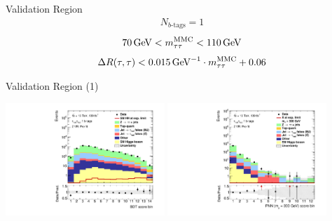 \documentclass[11pt, xcolor={dvipsnames}, aspectratio=169]{beamer}
\begin{document}

\begin{frame}{ Validation Region}
  \begin{align*}
    N_{b\text{-tags}} = 1
  \end{align*}
  \begin{align*}
    \SI{70}{\GeV} < \mMMC < \SI{110}{\GeV}
  \end{align*}
  \begin{align*}
    \dRtautau < \SI{0.015}{\per\GeV} \cdot \mMMC + 0.06
  \end{align*}
\end{frame}


\begin{frame}{ Validation Region (1)}
  \centering

  \includegraphics[width=0.45\textwidth]{vrplots/zvr/Region_BMin0_incJet1_distSMBDT_J2_Y2015_DLLOS_T1_SpcTauHH_L0_Prefitlog}%
  \hfill%
  \includegraphics[width=0.45\textwidth]{vrplots/zvr/Region_BMin0_incJet1_distPNN300_J2_Y2015_DLLOS_T1_SpcTauHH_L0_Prefitlog}
\end{frame}

\end{document}
